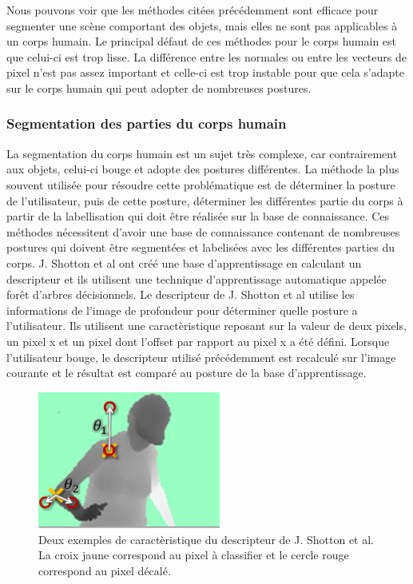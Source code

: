 Nous pouvons voir que les méthodes citées précédemment sont efficace pour segmenter une scène comportant des objets,
mais elles ne sont pas applicables à un corps humain. Le principal défaut de ces méthodes pour le corps humain est 
que celui-ci est trop lisse. La différence entre les normales ou entre les vecteurs de pixel n'est pas assez important
et celle-ci est trop instable pour que cela s'adapte sur le corps humain qui peut adopter de nombreuses postures.

\subsubsection{Segmentation des parties du corps humain}
La segmentation du corps humain est un sujet très complexe, car contrairement aux objets, celui-ci bouge et adopte
des postures différentes. La méthode la plus souvent utilisée pour résoudre cette problématique est de déterminer
la posture de l'utilisateur, puis de cette posture, déterminer les différentes partie du corps à partir de la labellisation
qui doit être réalisée sur la base de connaissance. 
Ces méthodes nécessitent d'avoir une base de connaissance contenant de nombreuses postures qui doivent
être segmentées et labelisées avec les différentes parties du corps. J. Shotton et al\cite{kinectSegmentation} ont
créé une base d'apprentissage en calculant un descripteur
et ils utilisent une technique d'apprentissage automatique appelée forêt d'arbres décisionnels\cite{randomDecisionForest}. 
Le descripteur de J. Shotton et al\cite{kinectSegmentation} utilise les informations de l'image de 
profondeur pour déterminer quelle posture a l'utilisateur. Ils utilisent une caractèristique reposant sur la valeur
de deux pixels, un pixel x et un pixel dont l'offset par rapport au pixel x a été défini.
Lorsque l'utilisateur bouge, le descripteur utilisé précédemment est recalculé sur l'image courante et le résultat 
est comparé au posture de la base d'apprentissage.\\

\begin{figure}[!ht]
  \begin{center}
    \includegraphics[width=6cm]{image/shotton.png}
    \caption{Deux exemples de caractèristique du descripteur de J. Shotton et al\cite{kinectSegmentation}. 
    La croix jaune correspond au pixel à classifier et le cercle rouge correspond au pixel décalé.}
  \end{center}
\end{figure}


